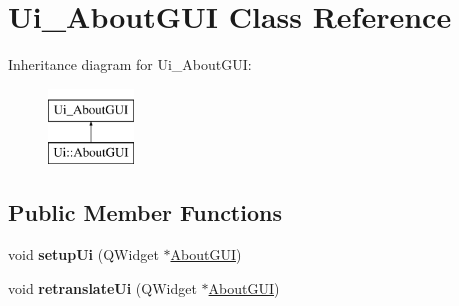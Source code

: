 \hypertarget{classUi__AboutGUI}{}\section{Ui\+\_\+\+About\+G\+UI Class Reference}
\label{classUi__AboutGUI}
Inheritance diagram for Ui\+\_\+\+About\+G\+UI\+:\begin{figure}[H]
\begin{center}
\leavevmode
\includegraphics[height=2.000000cm]{classUi__AboutGUI}
\end{center}
\end{figure}
\subsection*{Public Member Functions}
\begin{DoxyCompactItemize}
\item 
void {\bfseries setup\+Ui} (Q\+Widget $\ast$\hyperlink{classAboutGUI}{About\+G\+UI})\hypertarget{classUi__AboutGUI_a0aed70f40f32a23c8b1d687232aab37c}{}\label{classUi__AboutGUI_a0aed70f40f32a23c8b1d687232aab37c}

\item 
void {\bfseries retranslate\+Ui} (Q\+Widget $\ast$\hyperlink{classAboutGUI}{About\+G\+UI})\hypertarget{classUi__AboutGUI_a32d5c2ce60128bbcbc43fd6d03bf2499}{}\label{classUi__AboutGUI_a32d5c2ce60128bbcbc43fd6d03bf2499}

\end{DoxyCompactItemize}
